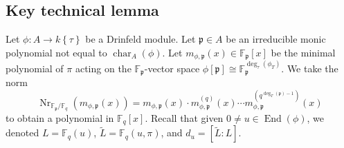 \documentclass[12pt]{amsart}
\theoremstyle{definition}
\theoremstyle{remark}
\numberwithin{equation}{section}
\numberwithin{thm}{section}
\DeclareMathOperator{\End}{End}
\DeclareMathOperator{\chr}{char}
\DeclareMathOperator{\Nr}{Nr}
\DeclareMathOperator{\Cent}{Cent}
\newcommand{\fp}{\mathfrak{p}}
\newcommand{\F}{\mathbb{F}}
\newcommand{\twist}[1]{#1\!\left\{\tau\right\}}
\begin{document}

\subsection{Key technical lemma}\label{sKeyLemma}

Let $\phi\colon A\to \twist{k}$ be a Drinfeld module. 
Let $\fp\in A$ be an irreducible monic polynomial not equal to $\chr_A(\phi)$. 
Let $m_{\phi, \fp}(x)\in \F_\fp[x]$ be the minimal polynomial of $\pi$ acting on the $\F_\fp$-vector space 
$\phi[\fp]\cong \F_\fp^{\deg_\tau(\phi_T)}$. We take the norm 
$$
\Nr_{\F_\fp/\F_q}(m_{\phi, \fp}(x))= m_{\phi, \fp}(x)\cdot m_{\phi, \fp}^{(q)}(x)\cdots m_{\phi, \fp}^{(q^{\deg_T(\fp)-1})}(x)  
$$
to obtain a polynomial in $\F_q[x]$. Recall that given $0\neq u\in \End(\phi)$, we denoted 
$L=\F_q(u)$, $\widetilde{L}=\F_q(u, \pi)$, and $d_u=[\widetilde{L}:L]$.  
\end{document}
